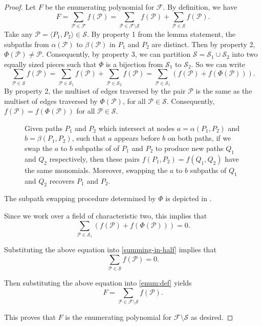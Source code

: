 \documentclass[11pt]{article}
\newcommand{\grp}[1]{\left(#1\right)}
\newcommand{\ca}{\mathcal}
\theoremstyle{definition}
\begin{document}
\begin{proof}
    Let $F$ be the enumerating polynomial for $\ca{F}$.
    By definition, we have 
        \begin{equation}
        \label{enum:def}
        F = \sum_{\ca{P}\in\ca{F}} f(\ca{P}) = \sum_{\ca{P}\in\ca{F}\setminus \ca{S}} f(\ca{P}) + \sum_{\ca{P}\in\ca{S}} f(\ca{P}).
        \end{equation}
Take any $\ca{P} = \langle P_1,P_2\rangle\in \ca{S}$.
By property 1 from the lemma statement, the subpaths from $\alpha(\ca{P})$ to $\beta(\ca{P})$ in $P_1$ and $P_2$ are distinct.
Then by property 2, $\Phi(\ca{P})\neq\ca{P}$.
Consequently, by property 3, we can partition $\ca{S} = \ca{S}_1\cup \ca{S}_2$ into two equally sized pieces such that $\Phi$ is a bijection from $\ca{S}_1$ to $\ca{S}_2$.
So we can write 
    \begin{equation}
    \label{summing-in-half}
    \sum_{\ca{P}\in\ca{S}} f(\ca{P}) = \sum_{\ca{P}\in\ca{S}_1} f(\ca{P}) + \sum_{\ca{P}\in\ca{S}_2} f(\ca{P}) = \sum_{\ca{P}\in\ca{S}_1} \grp{f(\ca{P}) + f(\Phi(\ca{P}))}.
    \end{equation}
By property 2, the multiset of edges traversed by the pair $\ca{P}$ is the same as the multiset of edges traversed by $\Phi(\ca{P})$, for all $\ca{P}\in\ca{S}$.
Consequently, $f(\ca{P}) = f(\Phi(\ca{P}))$ for all $\ca{P}\in \ca{S}$.

\begin{figure}[t]
    \centering
    
    \caption{Given paths $P_1$ and $P_2$ which intersect at nodes $a = \alpha(P_1, P_2)$ and $b=\beta(P_1, P_2)$, such that $a$ appears before $b$ on both paths, if we swap the $a$ to $b$ subpaths of of $P_1$ and $P_2$ to produce new paths $Q_1$ and $Q_2$ respectively, then these pairs $f(P_1, P_2) = f(Q_1, Q_2)$ have the same monomials. 
    Moreover, swapping the $a$ to $b$ subpaths of $Q_1$ and $Q_2$ recovers $P_1$ and $P_2$.}
    \label{fig:subpath-swap}
\end{figure}

The subpath swapping procedure determined by $\Phi$ is depicted in .

Since we work over a field of characteristic two, this implies that 
\[\sum_{\ca{P}\in\ca{S}_1} \grp{f(\ca{P}) + f(\Phi(\ca{P}))} = 0.\]

Substituting the above equation into \cref{summing-in-half} implies that 
    \[\sum_{\ca{P}\in\ca{S}} f(\ca{P}) = 0.\]

Then substituting the above equation into \cref{enum:def} yields 
    \[F = \sum_{\ca{P}\in\ca{F}\setminus \ca{S}} f(\ca{P}).\]

This proves that $F$ is the enumerating polynomial for $\ca{F}\setminus\ca{S}$ as desired.
\end{proof}
\end{document}
